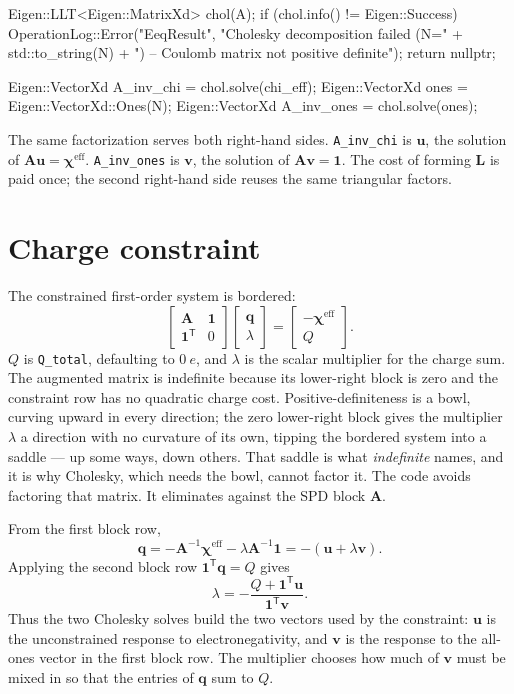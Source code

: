 \documentclass[11pt]{article}
\newcommand{\code}[1]{\texttt{#1}}
\begin{document}
\begin{codebox}
Eigen::LLT<Eigen::MatrixXd> chol(A);
if (chol.info() != Eigen::Success) {
    OperationLog::Error("EeqResult",
        "Cholesky decomposition failed (N=" + std::to_string(N) +
        ") -- Coulomb matrix not positive definite");
    return nullptr;
}

Eigen::VectorXd A_inv_chi = chol.solve(chi_eff);
Eigen::VectorXd ones = Eigen::VectorXd::Ones(N);
Eigen::VectorXd A_inv_ones = chol.solve(ones);
\end{codebox}

The same factorization serves both right-hand sides. \code{A\_inv\_chi} is
\(\bm u\), the solution of \(\bm A\bm u=\bm\chi^{\mathrm{eff}}\).
\code{A\_inv\_ones} is \(\bm v\), the solution of \(\bm A\bm v=\bm 1\). The
cost of forming \(\bm L\) is paid once; the second right-hand side reuses the
same triangular factors.

\section{Charge constraint}

The constrained first-order system is bordered:
\[
  \begin{bmatrix}
    \bm A & \bm 1\\
    \bm 1^{\mathsf T} & 0
  \end{bmatrix}
  \begin{bmatrix}\bm q\\ \lambda\end{bmatrix}
  =
  \begin{bmatrix}-\bm\chi^{\mathrm{eff}}\\ Q\end{bmatrix}.
\]
\(Q\) is \code{Q\_total}, defaulting to
\(\SI{0}{\elementarycharge}\), and \(\lambda\) is the scalar multiplier for the
charge sum. The augmented matrix is indefinite because its lower-right block is
zero and the constraint row has no quadratic charge cost.
Positive-definiteness is a bowl, curving upward in every direction; the zero
lower-right block gives the multiplier \(\lambda\) a direction with no curvature
of its own, tipping the bordered system into a saddle --- up some ways, down
others. That saddle is what \emph{indefinite} names, and it is why Cholesky,
which needs the bowl, cannot factor it. The code avoids
factoring that matrix. It eliminates against the SPD block \(\bm A\).

From the first block row,
\[
  \bm q = -\bm A^{-1}\bm\chi^{\mathrm{eff}}
          -\lambda\bm A^{-1}\bm 1
        = -(\bm u+\lambda\bm v).
\]
Applying the second block row \(\bm 1^{\mathsf T}\bm q=Q\) gives
\[
  \lambda =
  -\frac{Q+\bm 1^{\mathsf T}\bm u}{\bm 1^{\mathsf T}\bm v}.
\]
Thus the two Cholesky solves build the two vectors used by the constraint:
\(\bm u\) is the unconstrained response to electronegativity, and \(\bm v\) is
the response to the all-ones vector in the first block row. The multiplier
chooses how much of \(\bm v\) must be mixed in so that the entries of \(\bm q\)
sum to \(Q\).
\end{document}
